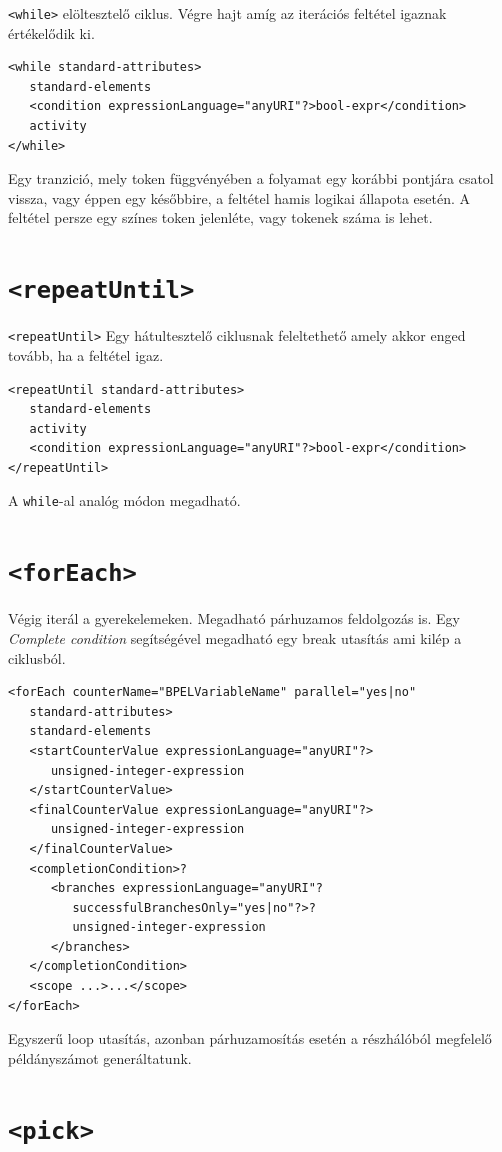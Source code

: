 \texttt{<while>} elöltesztelő ciklus. Végre hajt amíg az iterációs feltétel igaznak értékelődik ki. 
\begin{verbatim}
<while standard-attributes>
   standard-elements
   <condition expressionLanguage="anyURI"?>bool-expr</condition>
   activity
</while>
\end{verbatim}
Egy tranzició, mely token függvényében a folyamat egy korábbi pontjára csatol vissza, vagy éppen egy későbbire, a feltétel hamis logikai állapota esetén. A feltétel persze egy színes token jelenléte, vagy tokenek száma is lehet. 

\section{\texttt{<repeatUntil>}}

\texttt{<repeatUntil>} Egy hátultesztelő ciklusnak feleltethető amely akkor enged tovább, ha a feltétel igaz. 
\begin{verbatim}
<repeatUntil standard-attributes>
   standard-elements
   activity
   <condition expressionLanguage="anyURI"?>bool-expr</condition>
</repeatUntil>
\end{verbatim}
A \texttt{while}-al analóg módon megadható.

\section{\texttt{<forEach>}}

Végig iterál a gyerekelemeken. Megadható párhuzamos feldolgozás is. Egy \textit{Complete condition} segítségével megadható egy break utasítás ami kilép a ciklusból. 
\begin{verbatim}
<forEach counterName="BPELVariableName" parallel="yes|no"
   standard-attributes>
   standard-elements
   <startCounterValue expressionLanguage="anyURI"?>
      unsigned-integer-expression
   </startCounterValue>
   <finalCounterValue expressionLanguage="anyURI"?>
      unsigned-integer-expression
   </finalCounterValue>
   <completionCondition>?
      <branches expressionLanguage="anyURI"?
         successfulBranchesOnly="yes|no"?>?
         unsigned-integer-expression
      </branches>
   </completionCondition>
   <scope ...>...</scope>
</forEach>
\end{verbatim}
Egyszerű loop utasítás, azonban párhuzamosítás esetén a részhálóból megfelelő példányszámot generáltatunk. 

\section{\texttt{<pick>}}

